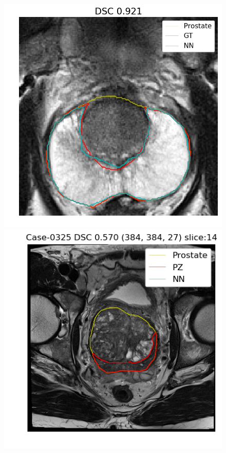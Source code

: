 \begin{figure}[h]
    \includegraphics[totalheight=.2\textheight]{imgs/results/PZ_Px_Challenge__P_yes_ROI_MAX_Case-0026.png}
    \vspace{10mm}
    \includegraphics[totalheight=.2\textheight]{imgs/results/PZ_Px_Challenge__P_yes_Original_MIN_Case-0325.png}

\end{figure}
